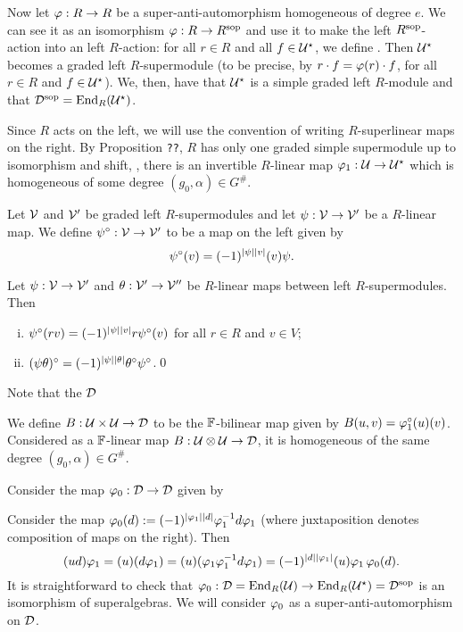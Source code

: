 \documentclass{amsbook}
\begin{document}
Now let $\varphi: R\to R$ be a super-anti-automorphism homogeneous of degree $e$.
We can see it as an isomorphism $\varphi: R\to R^{\mathrm{sop}}$ and use it to make the left $R^{\mathrm{sop}}$-action into an left $R$-action: for all $r\in R$ and all $f\in \mathcal U^\star$, we define .
Then $\mathcal U^\star$ becomes a graded left $R$-supermodule (to be precise, by $r\cdot f = \varphi(r)\cdot f$, for all $r\in R$ and $f\in \mathcal U^\star$).
We, then, have that $\mathcal U^\star$ is a simple graded left $R$-module and that $\mathcal{D}^{\mathrm{sop}} = \operatorname{End}_R(\mathcal U^\star)$.

Since $R$ acts on the left, we will use the convention of writing $R$-superlinear maps on the right. %
By Proposition {\tt ??}, $R$ has only one graded simple supermodule up to isomorphism and shift, \ie, there is an invertible $R$-linear map $\varphi_1: \mathcal U \to \mathcal U^\star$ which is homogeneous of some degree $(g_0, \alpha)\in G^\#$.

\begin{defi}
    Let $\mathcal V$ and $\mathcal V'$ be graded left $R$-supermodules and let $\psi: \mathcal V \to \mathcal V'$ be a $R$-linear map. We define $\psi^\circ: \mathcal V \to \mathcal V'$ to be a map on the left given by
    \[
        \psi^\circ(v) = (-1)^{|\psi||v|} (v)\psi.
    \]
\end{defi}

\begin{lemma}
    Let $\psi: \mathcal V \to \mathcal V'$ and $\theta: \mathcal V' \to \mathcal V''$ be $R$-linear maps between left $R$-supermodules. Then
    \begin{enumerate}[(i)]
        \item $\psi^\circ (rv) = (-1)^{|\psi||v|} r \psi^\circ (v)$ for all $r\in R$ and $v\in V$;
        \item $(\psi\theta)^\circ = (-1)^{|\psi||\theta|} \theta^\circ\psi^\circ$.\qed
    \end{enumerate}
\end{lemma}

Note that the $\mathcal{D}$

We define $B: \mathcal U\times \mathcal U \to \mathcal{D}$ to be the $\mathbb{F}$-bilinear map given by $B(u, v) = \varphi_1^\circ (u)(v)$. Considered as a $\mathbb{F}$-linear map $B: \mathcal U\otimes \mathcal U \to \mathcal{D}$, it is homogeneous of the same degree $(g_0, \alpha)\in G^\#$.

Consider the map $\varphi_0: \mathcal{D} \to \mathcal{D}$ given by $ $

Consider the map $\varphi_0(d) := (-1)^{|\varphi_1||d|}\varphi_1^{-1} d \varphi_1$ (where juxtaposition denotes composition of maps on the right).
Then
\begin{equation}\label{eq:sesquilinear-before-B}
    (ud)\varphi_1 = (u) (d\varphi_1) =  (u)(\varphi_1\varphi_1^{-1} d \varphi_1) = (-1)^{|d||\varphi_1|}(u)\varphi_1 \,\varphi_0(d).
\end{equation}
It is straightforward to check that $\varphi_0: \mathcal{D} = \operatorname{End}_R(\mathcal U) \to \operatorname{End}_R(\mathcal U^\star) = \mathcal{D}^{\mathrm{sop}}$ is an isomorphism of superalgebras.
We will consider $\varphi_0$ as a super-anti-automorphism on $\mathcal{D}$.
\end{document}
